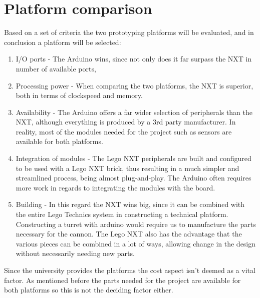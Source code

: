 \section{Platform comparison}
Based on a set of criteria the two prototyping platforms will be evaluated, and
in conclusion a platform will be selected:

\begin{enumerate}
  \item I/O ports - The Arduino wins, since not only does it far surpass
  the NXT in number of available ports, 
  \item Processing power - When comparing the two platforms, the NXT is
  superior, both in terms of clockspeed and memory.
  \item Availability - The Arduino offers a far wider selection of peripherals
  than the NXT, although everything is produced by a 3rd party manufacturer. In
  reality, most of the modules needed for the project such as sensors are
  available for both platforms.
  \item Integration of modules - The Lego NXT peripherals are built and
  configured to be used with a Lego NXT brick, thus resulting in a much simpler
  and streamlined process, being almost plug-and-play. The Arduino often
  requires more work in regards to integrating the modules with the board.
  \item Building - In this regard the NXT wins big, since it can be combined
  with the entire Lego Technics system in constructing a technical platform.
  Constructing a turret with arduino would require us to manufacture the parts
  necessary for the cannon. The Lego NXT also has the advantage that the various
  pieces can be combined in a lot of ways, allowing change in the design
  without necessarily needing new parts.
\end{enumerate}

Since the university provides the platforms the cost aspect isn't deemed as a
vital factor. As mentioned before the parts needed for the project are
available for both platforms so this is not the deciding factor either.

